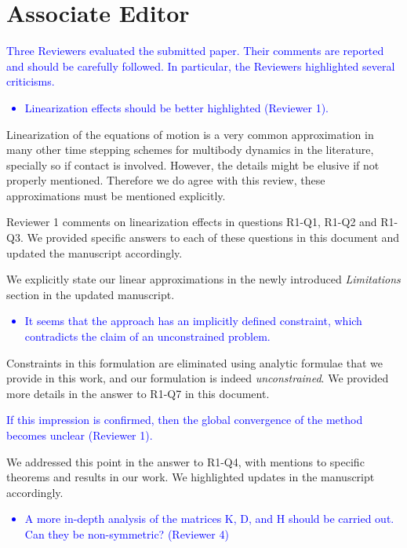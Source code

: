 \section{Associate Editor}
\label{sec:associate_editor}

\textcolor{blue}{Three Reviewers evaluated the submitted paper. Their comments
are reported and should be carefully followed. In particular, the Reviewers
highlighted several criticisms.}
\textcolor{blue}{\begin{itemize}
    \item Linearization effects should be better highlighted (Reviewer 1).
\end{itemize}}
Linearization of the equations of motion is a very common approximation in many
other time stepping schemes for multibody dynamics in the literature, specially
so if contact is involved. However, the details might be elusive if not properly
mentioned. Therefore we do agree with this review, these approximations must be
mentioned explicitly.

Reviewer 1 comments on linearization effects in questions R1-Q1, R1-Q2 and
R1-Q3. We provided specific answers to each of these questions in this document
and updated the manuscript accordingly. 

We explicitly state our linear approximations in the newly introduced
\emph{Limitations} section in the updated manuscript.

\textcolor{blue}{\begin{itemize}
    \item It seems that the approach has an implicitly defined constraint, which
    contradicts the claim of an unconstrained problem.
\end{itemize}}
Constraints in this formulation are eliminated using analytic formulae that we
provide in this work, and our formulation is indeed \emph{unconstrained}. We
provided more details in the answer to R1-Q7 in this document.

\textcolor{blue}{If this impression is confirmed, then the global convergence of
the method becomes unclear (Reviewer 1).}

We addressed this point in the answer to R1-Q4, with mentions to specific theorems and
results in our work. We highlighted updates in the manuscript accordingly.

\textcolor{blue}{
\begin{itemize}
    \item A more in-depth analysis of the matrices K, D, and H should be
    carried out. Can they be non-symmetric? (Reviewer 4)
\end{itemize}}

